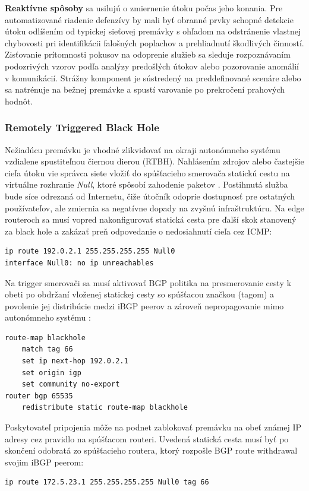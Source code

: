 \documentclass[12pt, a4paper]{article}
\begin{document}
\textbf{Reaktívne spôsoby} sa usilujú o zmiernenie útoku počas jeho konania. Pre automatizované
riadenie defenzívy by mali byť obranné prvky schopné detekcie útoku odlíšením od typickej sieťovej 
premávky s ohľadom na odstránenie vlastnej chybovosti pri identifikácii falošných poplachov
a prehliadnutí škodlivých činností. Zisťovanie prítomnosti pokusov na odoprenie služieb
sa sleduje rozpoznávaním podozrivých vzorov podľa analýzy predošlých útokov alebo
pozorovanie anomálií v komunikácií. Strážny komponent je sústredený na preddefinované scenáre alebo
sa natrénuje na bežnej premávke a spustí varovanie po prekročení prahových hodnôt.

\subsubsection{Remotely Triggered Black Hole} 
Nežiadúcu premávku je vhodné zlikvidovať na okraji autonómneho systému vzdialene spustiteľnou čiernou dierou 
(RTBH). Nahlásením zdrojov alebo  častejšie cieľa útoku vie správca siete vložiť do spúšťacieho smerovača 
statickú cestu na virtuálne rozhranie \emph{Null}, ktoré spôsobí zahodenie paketov \cite{RFC5635}. 
Postihnutá služba bude síce odrezaná od Internetu, čiže útočník odoprie dostupnosť pre ostatných 
používateľov, ale zmiernia sa negatívne dopady na zvyšnú infraštruktúru. Na edge routeroch sa musí vopred 
nakonfigurovať statická cesta pre ďalší skok stanovený za black hole a zakázať preň odpovedanie o 
nedosiahnutí cieľa cez ICMP:
\begin{lstlisting}
ip route 192.0.2.1 255.255.255.255 Null0
interface Null0: no ip unreachables
\end{lstlisting}
Na trigger smerovači sa musí aktivovať BGP politika na presmerovanie cesty k obeti 
po obdržaní vloženej statickej cesty so spúšťacou značkou (tagom) a povolenie jej distribúcie
medzi iBGP peerov a zároveň nepropagovanie mimo autonómneho systému \cite{cisco-rtbh}:

\begin{lstlisting}
route-map blackhole
    match tag 66
    set ip next-hop 192.0.2.1
    set origin igp
    set community no-export
router bgp 65535
    redistribute static route-map blackhole
\end{lstlisting}
Poskytovateľ pripojenia môže na podnet zablokovať premávku na obeť známej IP adresy
cez pravidlo na spúšťacom routeri. Uvedená statická cesta musí byť po skončení odobratá zo spúšťacieho 
routera, ktorý rozpošle BGP route withdrawal svojim iBGP peerom:
\begin{lstlisting}
ip route 172.5.23.1 255.255.255.255 Null0 tag 66
\end{lstlisting}
\end{document}
